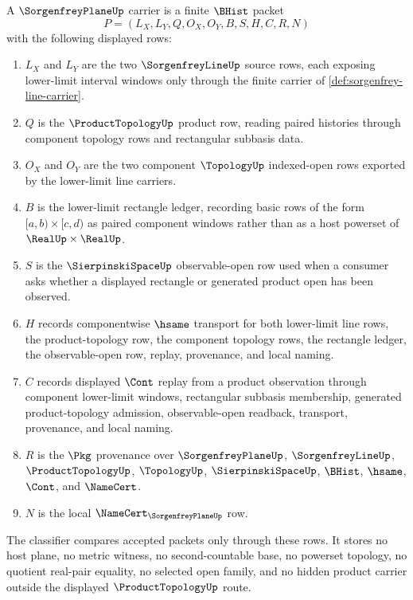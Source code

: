 \begin{definition}
\label{def:sorgenfrey-plane-carrier}
A $\SorgenfreyPlaneUp$ carrier is a finite $\BHist$ packet
$$
P=(L_X,L_Y,Q,O_X,O_Y,B,S,H,C,R,N)
$$
with the following displayed rows:
\begin{enumerate}
\item $L_X$ and $L_Y$ are the two $\SorgenfreyLineUp$ source rows, each exposing lower-limit interval windows only through the finite carrier of \autoref{def:sorgenfrey-line-carrier}.
\item $Q$ is the $\ProductTopologyUp$ product row, reading paired histories through component topology rows and rectangular subbasis data.
\item $O_X$ and $O_Y$ are the two component $\TopologyUp$ indexed-open rows exported by the lower-limit line carriers.
\item $B$ is the lower-limit rectangle ledger, recording basic rows of the form $[a,b)\times[c,d)$ as paired component windows rather than as a host powerset of $\RealUp\times\RealUp$.
\item $S$ is the $\SierpinskiSpaceUp$ observable-open row used when a consumer asks whether a displayed rectangle or generated product open has been observed.
\item $H$ records componentwise $\hsame$ transport for both lower-limit line rows, the product-topology row, the component topology rows, the rectangle ledger, the observable-open row, replay, provenance, and local naming.
\item $C$ records displayed $\Cont$ replay from a product observation through component lower-limit windows, rectangular subbasis membership, generated product-topology admission, observable-open readback, transport, provenance, and local naming.
\item $R$ is the $\Pkg$ provenance over $\SorgenfreyPlaneUp$, $\SorgenfreyLineUp$, $\ProductTopologyUp$, $\TopologyUp$, $\SierpinskiSpaceUp$, $\BHist$, $\hsame$, $\Cont$, and $\NameCert$.
\item $N$ is the local $\NameCert_{\SorgenfreyPlaneUp}$ row.
\end{enumerate}
The classifier compares accepted packets only through these rows. It stores no host plane, no metric witness, no second-countable base, no powerset topology, no quotient real-pair equality, no selected open family, and no hidden product carrier outside the displayed $\ProductTopologyUp$ route.
\end{definition}

